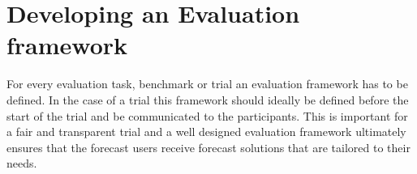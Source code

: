 






 

\section{Developing an Evaluation framework}\label{sec:evaluation_framework}
For every evaluation task, benchmark or trial an evaluation framework has to be defined. In the case of a trial this framework should ideally be defined before the start of the trial and be communicated to the participants. This is important for a fair and transparent trial and a well designed evaluation framework ultimately ensures that the forecast users receive forecast solutions that are tailored to their needs.

